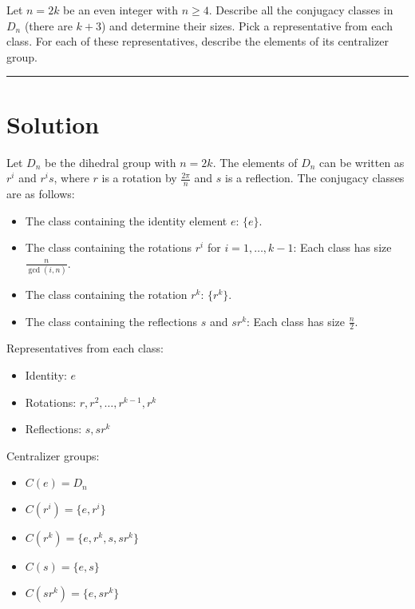 \documentclass[12pt]{amsart}
\theoremstyle{definition}
\numberwithin{equation}{section}
\begin{document}
\begin{exercise}{6} Let \(n=2k\) be an even integer with \(n \geq 4\). Describe all the conjugacy classes in \(D_n\) (there are \(k+3\)) and determine their sizes. Pick a representative from each class. For each of these representatives, describe the elements of its centralizer group.

    \noindent\rule{\linewidth}{1pt}

    \section*{Solution}
    
    Let \(D_n\) be the dihedral group with \(n = 2k\). The elements of \(D_n\) can be written as \(r^i\) and \(r^is\), where \(r\) is a rotation by \(\frac{2\pi}{n}\) and \(s\) is a reflection. The conjugacy classes are as follows:
    
    \begin{itemize}
        \item The class containing the identity element \(e\): \(\{e\}\).
        \item The class containing the rotations \(r^i\) for \(i=1, \ldots, k-1\): Each class has size \(\frac{n}{\gcd(i,n)}\).
        \item The class containing the rotation \(r^k\): \(\{r^k\}\).
        \item The class containing the reflections \(s\) and \(sr^k\): Each class has size \(\frac{n}{2}\).
    \end{itemize}
    
    Representatives from each class:
    \begin{itemize}
        \item Identity: \(e\)
        \item Rotations: \(r, r^2, \ldots, r^{k-1}, r^k\)
        \item Reflections: \(s, sr^k\)
    \end{itemize}
    
    Centralizer groups:
    \begin{itemize}
        \item \(C(e) = D_n\)
        \item \(C(r^i) = \{e, r^i\}\)
        \item \(C(r^k) = \{e, r^k, s, sr^k\}\)
        \item \(C(s) = \{e, s\}\)
        \item \(C(sr^k) = \{e, sr^k\}\)
    \end{itemize}
\end{exercise}
\newpage
\end{document}
